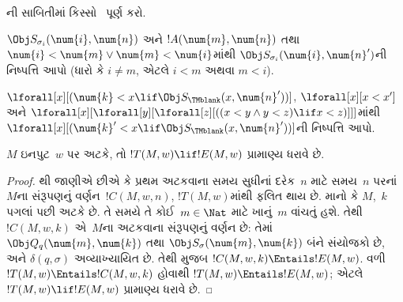 \begin{prob}
ની સાબિતીમાં
કિસ્સો~ પૂર્ણ કરો.
\end{prob}

\begin{prob}
$\Obj S_{\sigma_i}(\num{i}, \num{n})$ અને
$!A(\num{m}, \num{n})$ તથા
$\num{i}<\num{m}\lor\num{m}<\num{i}$માંથી
$\Obj S_{\sigma_i}(\num{i}, \num{n}')$ની
નિષ્પત્તિ આપો (ધારો કે $i \neq m$,
એટલે $i < m$ અથવા $m < i$).
\end{prob}

\begin{prob}
$\lforall[x][(\num{k} < x \lif \Obj
  S_\TMblank(x, \num{n}'))]$,
$\lforall[x][x < x']$ અને
$\lforall[x][\lforall[y][\lforall[z][ ((x < y \land y < z) \lif x <
      z)]]]$માંથી
$\lforall[x][(\num{k}' < x \lif \Obj
  S_\TMblank(x, \num{n}'))]$ની
નિષ્પત્તિ આપો.
\end{prob}

\begin{lem}
$M$ ઇનપુટ~$w$ પર અટકે, તો
$!T(M, w) \lif !E(M, w)$ પ્રામાણ્ય ધરાવે છે.
\end{lem}

\begin{proof}
થી જાણીએ છીએ કે પ્રથમ
અટકવાના સમય સુધીનાં દરેક~$n$ માટે
સમય~$n$ પરનાં~$M$ના સંરૂપણનું
વર્ણન~$!C(M, w, n)$,
$!T(M, w)$માંથી ફલિત થાય છે.
માનો કે $M$,~$k$ પગલાં પછી અટકે છે. તે સમયે
તે કોઈ~$m \in \Nat$ માટે ખાનું~$m$ વાંચતું હશે.
તેથી $!C(M, w, k)$ એ~$M$ના અટકવાના
સંરૂપણનું વર્ણન છે: તેમાં
$\Obj Q_q(\num{m}, \num{k})$ તથા
$\Obj S_\sigma(\num{m}, \num{k})$ બંને સંયોજકો છે,
અને $\delta(q,\sigma)$ અવ્યાખ્યાયિત છે. તેથી
 મુજબ
$!C(M, w, k) \Entails !E(M, w)$. વળી
$!T(M, w) \Entails !C(M, w, k)$ હોવાથી
$!T(M, w) \Entails !E(M, w)$; એટલે
$!T(M, w) \lif !E(M, w)$ પ્રામાણ્ય ધરાવે છે.
\end{proof}

